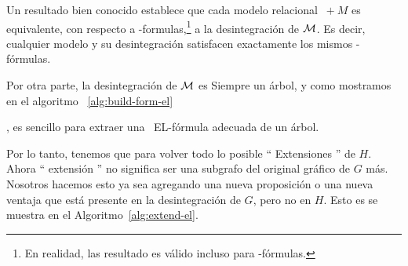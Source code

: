 {Un resultado bien conocido establece que cada modelo relacional $ \ + M $ es
equivalente, con respecto a \EL-formulas,\footnote{En realidad, las
resultado es válido incluso para \ALC-fórmulas.} a la desintegración de $\mathcal{M}$.
Es decir, cualquier modelo y su desintegración satisfacen exactamente los mismos \EL-fórmulas.
%


Por otra parte, la desintegración de $\mathcal{M}$ es
Siempre un árbol, y como mostramos en el algoritmo ~\ref{alg:build-form-el}},
es sencillo para extraer una \ EL-fórmula adecuada de un árbol.

Por lo tanto, tenemos que  para volver todo lo posible
`` Extensiones '' de $ H $. Ahora `` extensión '' no significa ser una
subgrafo del original gráfico de $ G $ más. Nosotros hacemos esto
ya sea agregando una nueva proposición o una nueva ventaja
que está presente en la desintegración de $ G $, pero no en $ H $. Esto es
se muestra en el Algoritmo~\ref{alg:extend-el}.

